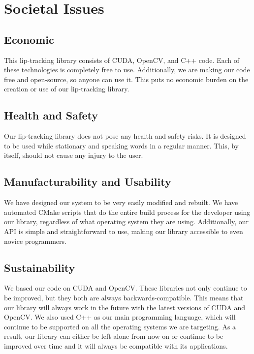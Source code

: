 \chapter{Societal Issues}

\section{Economic}
This lip-tracking library consists of CUDA, OpenCV, and C++ code. Each of these technologies is completely free to use. Additionally, we are making our code free and open-source, so anyone can use it. This puts no economic burden on the creation or use of our lip-tracking library.

\section{Health and Safety}
Our lip-tracking library does not pose any health and safety risks. It is designed to be used while stationary and speaking words in a regular manner. This, by itself, should not cause any injury to the user.

\section{Manufacturability and Usability}
We have designed our system to be very easily modified and rebuilt. We have automated CMake scripts that do the entire build process for the developer using our library, regardless of what operating system they are using. Additionally, our API is simple and straightforward to use, making our library accessible to even novice programmers.

\section{Sustainability}
We based our code on CUDA and OpenCV. These libraries not only continue to be improved, but they both are always backwards-compatible. This means that our library will always work in the future with the latest versions of CUDA and OpenCV. We also used C++ as our main programming language, which will continue to be supported on all the operating systems we are targeting. As a result, our library can either be left alone from now on or continue to be improved over time and it will always be compatible with its applications.

